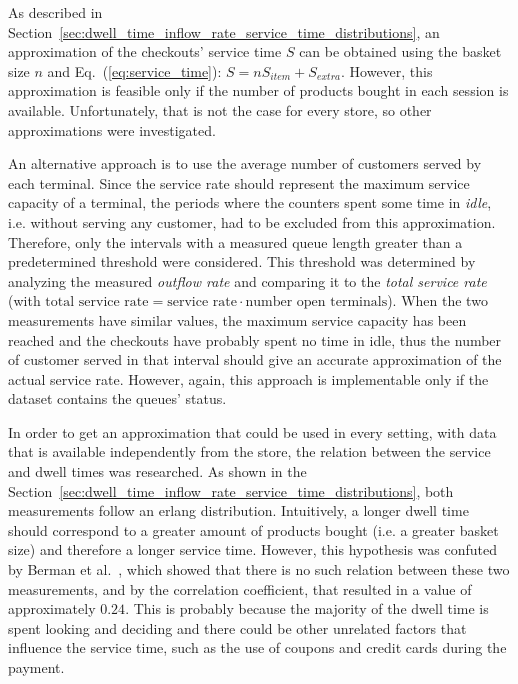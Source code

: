 As described in Section~\ref{sec:dwell_time_inflow_rate_service_time_distributions}, an approximation of the checkouts' service time \( S \) can be obtained using the basket size \( n \) and Eq.~(\ref{eq:service_time}): \( S = n S_{item} + S_{extra} \). However, this approximation is feasible only if the number of products bought in each session is available. Unfortunately, that is not the case for every store, so other approximations were investigated.

An alternative approach is to use the average number of customers served by each terminal. Since the service rate should represent the maximum service capacity of a terminal, the periods where the counters spent some time in \emph{idle}, i.e. without serving any customer, had to be excluded from this approximation. Therefore, only the intervals with a measured queue length greater than a predetermined threshold were considered. This threshold was determined by analyzing the measured \emph{outflow rate} and comparing it to the \emph{total service rate} (with \(\text{total service rate} = \text{service rate} \cdot \text{number open terminals} \)). When the two measurements have similar values, the maximum service capacity has been reached and the checkouts have probably spent no time in idle, thus the number of customer served in that interval should give an accurate approximation of the actual service rate. However, again, this approach is implementable only if the dataset contains the queues’ status.

In order to get an approximation that could be used in every setting, with data that is available independently from the store, the relation between the service and dwell times was researched. As shown in the Section~\ref{sec:dwell_time_inflow_rate_service_time_distributions}, both measurements follow an erlang distribution. Intuitively, a longer dwell time should correspond to a greater amount of products bought (i.e. a greater basket size) and therefore a longer service time. However, this hypothesis was confuted by Berman et al.~\cite{berman}, which showed that there is no such relation between these two measurements, and by the correlation coefficient, that resulted in a value of approximately \( 0.24 \). This is probably because the majority of the dwell time is spent looking and deciding and there could be other unrelated factors that influence the service time, such as the use of coupons and credit cards during the payment.

